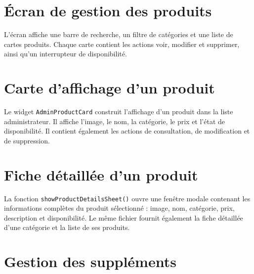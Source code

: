 \documentclass[12pt,a4paper]{report}
\begin{document}


\section{Écran de gestion des produits}

L'écran affiche une barre de recherche, un filtre de catégories et une liste
de cartes produits. Chaque carte contient les actions voir, modifier et supprimer,
ainsi qu'un interrupteur de disponibilité.



\section{Carte d'affichage d'un produit}

Le widget \texttt{AdminProductCard} construit l'affichage d'un produit dans la
liste administrateur. Il affiche l'image, le nom, la catégorie, le prix et
l'état de disponibilité. Il contient également les actions de consultation,
de modification et de suppression.



\section{Fiche détaillée d'un produit}

La fonction \texttt{showProductDetailsSheet()} ouvre une fenêtre modale contenant
les informations complètes du produit sélectionné : image, nom, catégorie,
prix, description et disponibilité. Le même fichier fournit également la fiche
détaillée d'une catégorie et la liste de ses produits.



\section{Gestion des suppléments}
\end{document}
